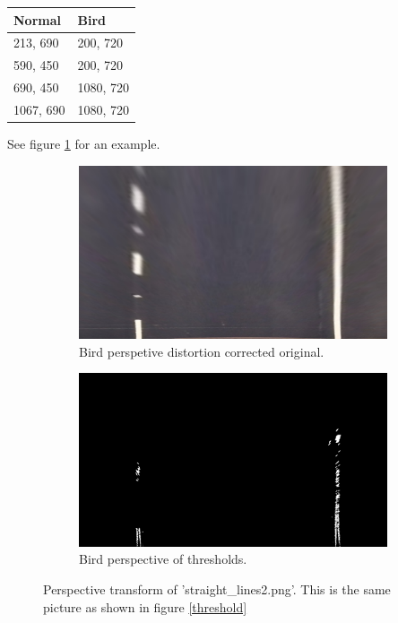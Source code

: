 \documentclass[12pt,a4paper]{article}
\begin{document}
\begin{tabular}{| l | l |}
\hline
Normal & Bird \\
\hline
213, 690 & 200, 720 \\
590, 450 & 200, 720 \\
690, 450 & 1080, 720 \\
1067, 690 & 1080, 720 \\
\hline
\end{tabular}

See figure \ref{perspective} for an example.

\begin{figure}
    \centering
    \begin{subfigure}[b]{0.45\textwidth}
        \includegraphics[width=\textwidth]{../output_images/transformed-straight_lines2.jpg}
        \caption{Bird perspetive distortion corrected original.}
    \end{subfigure}
    \begin{subfigure}[b]{0.45\textwidth}
        \includegraphics[width=\textwidth]{../output_images/combinedAndTransformed-straight_lines2.png}
        \caption{Bird perspective of thresholds.}
    \end{subfigure}
    \caption{Perspective transform of 'straight\_lines2.png'. This is the same picture as shown in figure \ref{threshold}}
    \label{perspective}
\end{figure}
\end{document}

